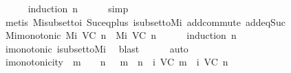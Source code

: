 \begin{isabellebody}
%
\isadelimproof
\ \ \ \ %
\endisadelimproof
%
\isatagproof
{}\isamarkupfalse%
\ {\isacharparenleft}induction\ n{\isacharparenright}\isanewline
\ \ \ \ \isamarkupfalse%
\ simp\isanewline
\ \ \ \ \isamarkupfalse%
\ {\isacharparenleft}metis\ Mi{\isacharunderscore}subset{\isacharunderscore}to{\isacharunderscore}{\isasymSigma}i\ Suc{\isacharunderscore}eq{\isacharunderscore}plus{}\ {\isasymSigma}i{\isacharunderscore}subset{\isacharunderscore}to{\isacharunderscore}Mi\ add{\isachardot}commute\ add{\isacharunderscore}{}{\isacharunderscore}eq{\isacharunderscore}Suc{\isacharparenright}\isanewline
\ \ \ \ \isamarkupfalse%
%
\endisatagproof
{\isafoldproof}%
%
\isadelimproof
\isanewline
%
\endisadelimproof
\isanewline
\ \ \isamarkupfalse%
\ Mi{\isacharunderscore}monotonic{\isacharcolon}\ {\isachardoublequoteopen}M{\isacharunderscore}i\ {\isacharparenleft}V{\isacharcomma}C{\isacharcomma}{\isasymepsilon}{\isacharparenright}\ n\ {\isasymsubseteq}\ M{\isacharunderscore}i\ {\isacharparenleft}V{\isacharcomma}C{\isacharcomma}{\isasymepsilon}{\isacharparenright}\ {\isacharparenleft}n{\isacharplus}{}{\isacharparenright}{\isachardoublequoteclose}\isanewline
%
\isadelimproof
\ \ \ \ %
\endisadelimproof
%
\isatagproof
{}\isamarkupfalse%
\ {\isacharparenleft}induction\ n{\isacharparenright}\isanewline
\ \ \ \ \isamarkupfalse%
\isanewline
\ \ \ \ \isamarkupfalse%
\ {\isasymSigma}i{\isacharunderscore}monotonic\ {\isasymSigma}i{\isacharunderscore}subset{\isacharunderscore}to{\isacharunderscore}Mi\ \isamarkupfalse%
\ blast\isanewline
\ \ \ \ \isamarkupfalse%
\ auto\isanewline
\ \ \ \ \isamarkupfalse%
%
\endisatagproof
{\isafoldproof}%
%
\isadelimproof
\isanewline
%
\endisadelimproof
\isanewline
\ \ \isamarkupfalse%
\ {\isasymSigma}i{\isacharunderscore}monotonicity{\isacharcolon}\ {\isachardoublequoteopen}{\isasymforall}\ m\ {\isasymin}\ {\isasymnat}{\isachardot}\ {\isasymforall}\ n\ {\isasymin}\ {\isasymnat}{\isachardot}\ m\ {\isasymle}\ n\ {\isasymlongrightarrow}\ {\isasymSigma}{\isacharunderscore}i\ {\isacharparenleft}V{\isacharcomma}C{\isacharcomma}{\isasymepsilon}{\isacharparenright}\ m\ {\isasymsubseteq}\ {\isasymSigma}{\isacharunderscore}i\ {\isacharparenleft}V{\isacharcomma}C{\isacharcomma}{\isasymepsilon}{\isacharparenright}\ n{\isachardoublequoteclose}\isanewline
%
\isadelimproof
\ \ \ \ %
\endisadelimproof
%
\isatagproof
{}\isamarkupfalse%

\end{isabellebody}

